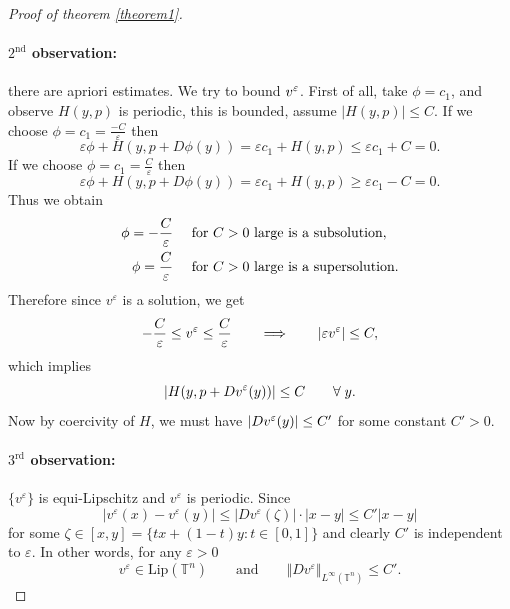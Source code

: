 \documentclass[12pt, oneside]{amsart}  	%
\begin{document}
\begin{proof}[Proof of theorem \ref{theorem1}]
\paragraph{\textbf{$2^{\text{nd}}$ observation:}} there are apriori estimates. We try to bound $v^\varepsilon$. First of all, take $\phi=c_1$, and observe $H(y,p)$ is periodic, this is bounded, assume $|H(y,p)|\leq C$. If we choose $\phi = c_1 = \frac{-C}{\varepsilon}$ then
\begin{equation*}
\varepsilon \phi + H(y,p+D\phi(y)) = \varepsilon c_1 + H(y,p) \leq \varepsilon c_1 + C =0.
\end{equation*}
If we choose $\phi = c_1 = \frac{C}{\varepsilon}$ then
\begin{equation*}
\varepsilon \phi + H(y,p+D\phi(y)) = \varepsilon c_1 + H(y,p) \geq \varepsilon c_1 - C =0.
\end{equation*}
Thus we obtain 
\begin{align*}
\phi = -\frac{C}{\varepsilon}\quad &\text{ for $C>0$ large is a subsolution}, \\
\phi = \frac{C}{\varepsilon}\quad &\text{ for $C>0$ large is a supersolution}.
\end{align*}
Therefore since $v^\varepsilon$ is a solution, we get
\begin{equation*}
-\frac{C}{\varepsilon} \le v^\varepsilon \le \frac{C}{\varepsilon} \qquad\Longrightarrow\qquad |\varepsilon v^\varepsilon| \leq C,
\end{equation*}
which implies 
\begin{equation*}
|H(y, p + Dv^\varepsilon(y))|\le C \qquad\forall\;y.
\end{equation*}
Now by coercivity of $H$, we must have $|Dv^\varepsilon(y)|\le C'$ for some constant $C'>0$.\\

\paragraph{\textbf{$3^{\text{rd}}$ observation:}} $\{v^\varepsilon\}$ is equi-Lipschitz and $v^\varepsilon$ is periodic. Since
\begin{equation*}
|v^\varepsilon(x) - v^\varepsilon(y)|\leq |Dv^\varepsilon(\zeta)|\cdot |x-y| \leq C'|x-y|
\end{equation*}
for some $\zeta\in [x,y] = \{tx+(1-t)y: t\in [0,1]\}$ and clearly $C'$ is independent to $\varepsilon$. In other words, for any $\varepsilon>0$
\begin{equation*}
v^\varepsilon \in \text{Lip}(\mathbb{T}^n)\qquad\text{and}\qquad \Vert Dv^\varepsilon\Vert_{L^\infty(\mathbb{T}^n)} \leq C'.
\end{equation*}


\end{proof}
\end{document}
